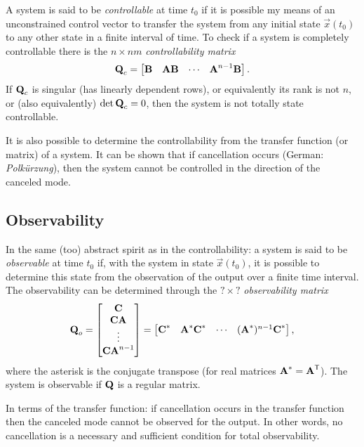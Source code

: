 A system is said to be \emph{controllable} at time \(t_0\) if it is possible my means of an unconstrained control vector to transfer the system from any initial state \(\vec{x}(t_0)\) to any other state in a finite interval of time. To check if a system is completely controllable there is the \(n\times  nm\) \emph{controllability matrix}
\[
	\bm{\mathrm{Q}}_c = \begin{bmatrix}
		\bm{\mathrm{B}} & \bm{\mathrm{A}}\bm{\mathrm{B}} & \cdots & \bm{\mathrm{A}}^{n-1}\bm{\mathrm{B}}
	\end{bmatrix}.
\]
If \(\bm{\mathrm{Q}}_c\) is singular (has linearly dependent rows), or equivalently its rank is not \(n\), or (also equivalently) \(\det \bm{\mathrm{Q}}_c = 0\), then the system is not totally state controllable.

It is also possible to determine the controllability from the transfer function (or matrix) of a system. It can be shown that if cancellation occurs (German: \textsl{Polkürzung}), then the system cannot be controlled in the direction of the canceled mode.

\subsection{Observability}

In the same (too) abstract spirit as in the controllability: a system is said to be \emph{observable} at time \(t_0\) if, with the system in state \(\vec{x}(t_0)\), it is possible to determine this state from the observation of the output over a finite time interval. The observability can be determined through the \(?\times ?\) \emph{observability matrix}
\[
	\bm{\mathrm{Q}}_o = \begin{bmatrix}
		\bm{\mathrm{C}} \\ \bm{\mathrm{C}}\bm{\mathrm{A}} \\ \vdots \\ \bm{\mathrm{C}}\bm{\mathrm{A}}^{n-1}
	\end{bmatrix} = \begin{bmatrix}
		\bm{\mathrm{C}}^* & \bm{\mathrm{A}}^* \bm{\mathrm{C}}^* & \cdots & (\bm{\mathrm{A}}^*)^{n-1}\bm{\mathrm{C}}^*
	\end{bmatrix},
\]
where the asterisk is the conjugate transpose (for real matrices \(\bm{\mathrm{A}}^* = \bm{\mathrm{A}}^\mathsf{T}\)). The system is observable if \(\bm{\mathrm{Q}}\) is a regular matrix.

In terms of the transfer function: if cancellation occurs in the transfer function then the canceled mode cannot be observed for the output. In other words, no cancellation is a necessary and sufficient condition for total observability.

